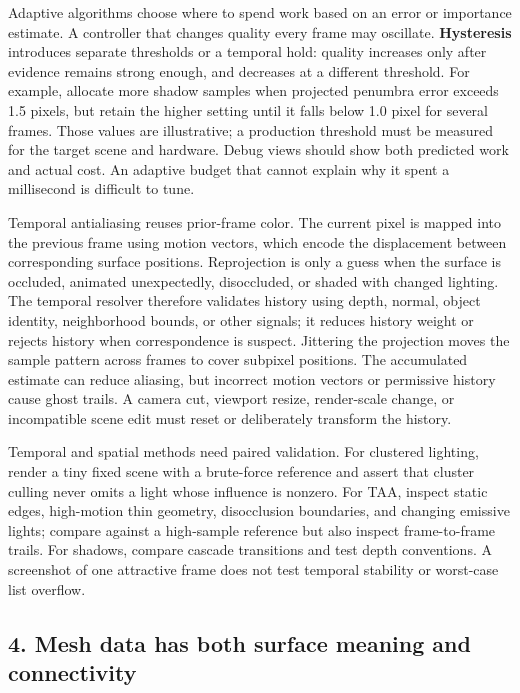 Adaptive algorithms choose where to spend work based on an error or importance estimate. A controller that changes quality every frame may oscillate. \textbf{Hysteresis} introduces separate thresholds or a temporal hold: quality increases only after evidence remains strong enough, and decreases at a different threshold. For example, allocate more shadow samples when projected penumbra error exceeds 1.5 pixels, but retain the higher setting until it falls below 1.0 pixel for several frames. Those values are illustrative; a production threshold must be measured for the target scene and hardware. Debug views should show both predicted work and actual cost. An adaptive budget that cannot explain why it spent a millisecond is difficult to tune.

Temporal antialiasing reuses prior-frame color. The current pixel is mapped into the previous frame using motion vectors, which encode the displacement between corresponding surface positions. Reprojection is only a guess when the surface is occluded, animated unexpectedly, disoccluded, or shaded with changed lighting. The temporal resolver therefore validates history using depth, normal, object identity, neighborhood bounds, or other signals; it reduces history weight or rejects history when correspondence is suspect. Jittering the projection moves the sample pattern across frames to cover subpixel positions. The accumulated estimate can reduce aliasing, but incorrect motion vectors or permissive history cause ghost trails. A camera cut, viewport resize, render-scale change, or incompatible scene edit must reset or deliberately transform the history.

Temporal and spatial methods need paired validation. For clustered lighting, render a tiny fixed scene with a brute-force reference and assert that cluster culling never omits a light whose influence is nonzero. For TAA, inspect static edges, high-motion thin geometry, disocclusion boundaries, and changing emissive lights; compare against a high-sample reference but also inspect frame-to-frame trails. For shadows, compare cascade transitions and test depth conventions. A screenshot of one attractive frame does not test temporal stability or worst-case list overflow.

\subsection{4. Mesh data has both surface meaning and connectivity}\label{04-visual-computing-ii-ch037-mesh-data-has-both-surface-meaning-and-connectivity}

